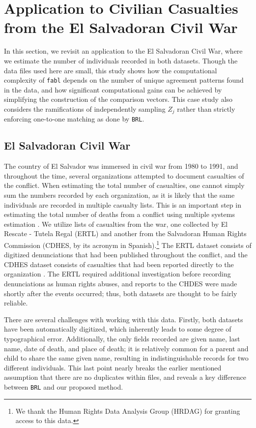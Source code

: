\documentclass[12pt,letterpaper]{article}
\newcommand{\1}[1]{\mathbb{I}\!\left[#1\right]} %
\begin{document}
\section{Application to Civilian Casualties from the El Salvadoran Civil War}
\label{sec:case-studies}

In this section, we revisit an application to the El Salvadoran Civil War, where we estimate the number of individuals recorded in both datasets. Though the data files used here are small, this study shows how the computational complexity of \texttt{fabl} depends on the number of unique agreement patterns found in the data, and how significant computational gains can be achieved by simplifying the construction of the comparison vectors. This case study also considers the ramifications of independently sampling $Z_j$ rather than strictly enforcing one-to-one matching as done by \texttt{BRL}. 

\subsection{El Salvadoran Civil War}
\label{el_salvador}

The country of El Salvador was immersed in civil war from 1980 to 1991,
and throughout the time, several organizations attempted to document
casualties of the conflict. When estimating the total number of
casualties, one cannot simply sum the numbers recorded by each
organization, as it is likely that the same individuals are recorded in
multiple casualty lists. This is an important step in estimating the total number of deaths from a conflict using multiple systems estimation \citep{lum2013applications}. We utilize lists of casualties from the war, one collected by El Rescate - Tutela
Regal (ERTL) and another from the Salvadoran Human Rights Commission (CDHES, by its
acronym in Spanish).\footnote{We thank the Human Rights Data Analysis Group (HRDAG) for granting access to this data.} The ERTL dataset consists of digitized denunciations that
had been published throughout the conflict, and the CDHES dataset consists
of casualties that had been reported directly to the organization \citep{howland2008rescate, ball2000salvadoran}. The ERTL required additional investigation before recording denunciations as human rights abuses, and reports to the CHDES were made shortly after the events occurred; thus, both datasets are thought to be fairly reliable.

There are several challenges with working with this data. Firstly, both
datasets have been automatically digitized, which inherently leads to
some degree of typographical error. Additionally, the only fields recorded are given name, last name, date of death, and place of death; it is relatively common for a
parent and child to share the same given name, resulting in
indistinguishable records for two different individuals. This last point
nearly breaks the earlier mentioned assumption that there are no
duplicates within files, and reveals a key difference between
\texttt{BRL} and our proposed method.
\end{document}

